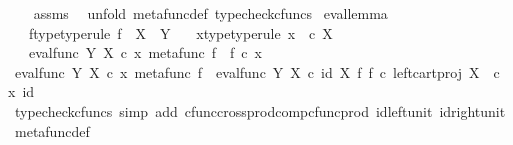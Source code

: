 \begin{isabellebody}
%
\isadelimproof
\ \ %
\endisadelimproof
%
\isatagproof
{}\isamarkupfalse%
\ assms\ \isamarkupfalse%
\ {\isacharparenleft}{\kern0pt}unfold\ metafunc{\isacharunderscore}{\kern0pt}def{}{\isacharcomma}{\kern0pt}\ typecheck{\isacharunderscore}{\kern0pt}cfuncs{\isacharparenright}{\kern0pt}%
\endisatagproof
{\isafoldproof}%
%
\isadelimproof
\isanewline
%
\endisadelimproof
\isanewline
{}\isamarkupfalse%
\ eval{\isacharunderscore}{\kern0pt}lemma{\isacharcolon}{\kern0pt}\isanewline
\ \ \ f{\isacharunderscore}{\kern0pt}type{\isacharbrackleft}{\kern0pt}type{\isacharunderscore}{\kern0pt}rule{\isacharbrackright}{\kern0pt}{\isacharcolon}{\kern0pt}\ {\isachardoublequoteopen}f\ {\isacharcolon}{\kern0pt}\ X\ {\isasymrightarrow}\ Y{\isachardoublequoteclose}\isanewline
\ \ \ x{\isacharunderscore}{\kern0pt}type{\isacharbrackleft}{\kern0pt}type{\isacharunderscore}{\kern0pt}rule{\isacharbrackright}{\kern0pt}{\isacharcolon}{\kern0pt}\ {\isachardoublequoteopen}x\ \ {\isasymin}\isactrlsub c\ X{\isachardoublequoteclose}\isanewline
\ \ \ {\isachardoublequoteopen}eval{\isacharunderscore}{\kern0pt}func\ Y\ X\ {\isasymcirc}\isactrlsub c\ {\isasymlangle}x{\isacharcomma}{\kern0pt}\ metafunc\ f{\isasymrangle}\ {\isacharequal}{\kern0pt}\ f\ {\isasymcirc}\isactrlsub c\ x{\isachardoublequoteclose}\isanewline
%
\isadelimproof
%
\endisadelimproof
%
\isatagproof
{}\isamarkupfalse%
\ {\isacharminus}{\kern0pt}\ \isanewline
\ \ \isamarkupfalse%
\ {\isachardoublequoteopen}eval{\isacharunderscore}{\kern0pt}func\ Y\ X\ {\isasymcirc}\isactrlsub c\ {\isasymlangle}x{\isacharcomma}{\kern0pt}\ metafunc\ f{\isasymrangle}\ {\isacharequal}{\kern0pt}\ eval{\isacharunderscore}{\kern0pt}func\ Y\ X\ {\isasymcirc}\isactrlsub c\ {\isacharparenleft}{\kern0pt}id\ X\ {\isasymtimes}\isactrlsub f\ {\isacharparenleft}{\kern0pt}f\ {\isasymcirc}\isactrlsub c\ {\isacharparenleft}{\kern0pt}left{\isacharunderscore}{\kern0pt}cart{\isacharunderscore}{\kern0pt}proj\ X\ {\isasymone}{\isacharparenright}{\kern0pt}{\isacharparenright}{\kern0pt}\isactrlsup {\isasymsharp}{\isacharparenright}{\kern0pt}\ {\isasymcirc}\isactrlsub c\ {\isasymlangle}x{\isacharcomma}{\kern0pt}\ id\ {\isasymone}{\isasymrangle}{\isachardoublequoteclose}\isanewline
\ \ \ \ \isamarkupfalse%
\ {\isacharparenleft}{\kern0pt}typecheck{\isacharunderscore}{\kern0pt}cfuncs{\isacharcomma}{\kern0pt}\ simp\ add{\isacharcolon}{\kern0pt}\ cfunc{\isacharunderscore}{\kern0pt}cross{\isacharunderscore}{\kern0pt}prod{\isacharunderscore}{\kern0pt}comp{\isacharunderscore}{\kern0pt}cfunc{\isacharunderscore}{\kern0pt}prod\ id{\isacharunderscore}{\kern0pt}left{\isacharunderscore}{\kern0pt}unit{}\ id{\isacharunderscore}{\kern0pt}right{\isacharunderscore}{\kern0pt}unit{}\ metafunc{\isacharunderscore}{\kern0pt}def{}{\isacharparenright}{\kern0pt}\isanewline

\end{isabellebody}

